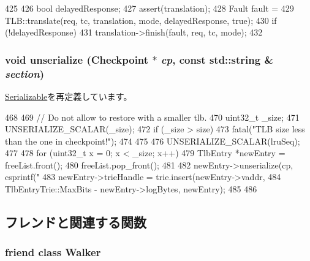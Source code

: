 \begin{DoxyCode}
425 {
426     bool delayedResponse;
427     assert(translation);
428     Fault fault =
429         TLB::translate(req, tc, translation, mode, delayedResponse, true);
430     if (!delayedResponse)
431         translation->finish(fault, req, tc, mode);
432 }
\end{DoxyCode}
\hypertarget{classX86ISA_1_1TLB_af22e5d6d660b97db37003ac61ac4ee49}{
\subsubsection[{unserialize}]{\setlength{\rightskip}{0pt plus 5cm}void unserialize ({\bf Checkpoint} $\ast$ {\em cp}, \/  const std::string \& {\em section})}}
\label{classX86ISA_1_1TLB_af22e5d6d660b97db37003ac61ac4ee49}


\hyperlink{classSerializable_af100c4e9feabf3cd918619c88c718387}{Serializable}を再定義しています。


\begin{DoxyCode}
468 {
469     // Do not allow to restore with a smaller tlb.
470     uint32_t _size;
471     UNSERIALIZE_SCALAR(_size);
472     if (_size > size) {
473         fatal("TLB size less than the one in checkpoint!");
474     }
475 
476     UNSERIALIZE_SCALAR(lruSeq);
477 
478     for (uint32_t x = 0; x < _size; x++) {
479         TlbEntry *newEntry = freeList.front();
480         freeList.pop_front();
481 
482         newEntry->unserialize(cp, csprintf("%
483         newEntry->trieHandle = trie.insert(newEntry->vaddr,
484             TlbEntryTrie::MaxBits - newEntry->logBytes, newEntry);
485     }
486 }
\end{DoxyCode}


\subsection{フレンドと関連する関数}
\hypertarget{classX86ISA_1_1TLB_a561951adc2bae72717df4b975c66f02f}{
\subsubsection[{Walker}]{\setlength{\rightskip}{0pt plus 5cm}friend class {\bf Walker}}}
\label{classX86ISA_1_1TLB_a561951adc2bae72717df4b975c66f02f}


